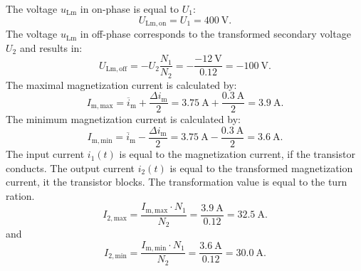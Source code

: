 \begin{solutionblock}
	The voltage $u_\mathrm{Lm}$ in on-phase is equal to $U_\mathrm{1}$:
	\begin{equation*}
		U_\mathrm{Lm,on}= U_\mathrm{1} = \SI{400}{\volt}.
	\end{equation*}
	The voltage $u_\mathrm{Lm}$ in off-phase corresponds to the transformed secondary voltage $U_\mathrm{2}$ and results in:
	\begin{equation*}
		U_\mathrm{Lm,off}= -U_\mathrm{2} \frac{N_\mathrm{1}}{N_\mathrm{2}} = - \frac{- \SI{12}{\volt}}{0.12} = -\SI{100}{\volt}.
	\end{equation*}
	The maximal magnetization current is calculated by:
	\begin{equation*}
		I_\mathrm{m,max} = \overline{i}_\mathrm{m} + \frac{\Delta i_\mathrm{m}}{2}  = \SI{3.75}{\ampere} + \frac{\SI{0.3}{\ampere}}{2}  = \SI{3.9}{\ampere}.
	\end{equation*}
	The minimum magnetization current is calculated by:
	\begin{equation*}
		I_\mathrm{m,min} = \overline{i}_\mathrm{m} - \frac{\Delta i_\mathrm{m}}{2}  = \SI{3.75}{\ampere} - \frac{\SI{0.3}{\ampere}}{2}  = \SI{3.6}{\ampere}.
	\end{equation*}
	The input current $i_\mathrm{1}(t)$ is equal to the magnetization current, if the transistor conducts.
	The output current $i_\mathrm{2}(t)$ is equal to the transformed magnetization current, it the transistor blocks.
	The transformation value is equal to the turn ration.
	\begin{equation*}
		I_\mathrm{2,max} = \frac{I_\mathrm{m,max} \cdot N_\mathrm{1}}{N_\mathrm{2}} = \frac{\SI{3.9}{\ampere}}{0.12} = \SI{32.5}{\ampere}.
	\end{equation*}
	and
	\begin{equation*}
		I_\mathrm{2,min} = \frac{I_\mathrm{m,min} \cdot N_\mathrm{1}}{N_\mathrm{2}} = \frac{\SI{3.6}{\ampere}}{0.12} = \SI{30.0}{\ampere}.
	\end{equation*}
	
\end{solutionblock}

